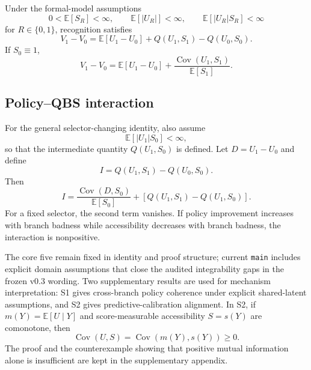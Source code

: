 Under the formal-model assumptions
\[
0<\mathbb E[S_R]<\infty,
\qquad
\mathbb E[|U_R|]<\infty,
\qquad
\mathbb E[|U_R|S_R]<\infty
\]
for $R\in\{0,1\}$, recognition satisfies
\[
V_1-V_0
=
\mathbb E[U_1-U_0]
+
Q(U_1,S_1)-Q(U_0,S_0).
\]
If $S_0\equiv1$,
\[
V_1-V_0
=
\mathbb E[U_1-U_0]
+
\frac{\operatorname{Cov}(U_1,S_1)}{\mathbb E[S_1]}.
\]

\subsection{Policy--QBS interaction}

For the general selector-changing identity, also assume
\[
\mathbb E[|U_1|S_0]<\infty,
\]
so that the intermediate quantity $Q(U_1,S_0)$ is defined. Let $D=U_1-U_0$ and define
\[
I=Q(U_1,S_1)-Q(U_0,S_0).
\]
Then
\[
I
=
\frac{\operatorname{Cov}(D,S_0)}{\mathbb E[S_0]}
+
\left[Q(U_1,S_1)-Q(U_1,S_0)\right].
\]
For a fixed selector, the second term vanishes. If policy improvement increases with branch badness while accessibility decreases with branch badness, the interaction is nonpositive.

The core five remain fixed in identity and proof structure; current \texttt{main} includes explicit domain assumptions that close the audited integrability gaps in the frozen v0.3 wording. Two supplementary results are used for mechanism interpretation: S1 gives cross-branch policy coherence under explicit shared-latent assumptions, and S2 gives predictive-calibration alignment. In S2, if $m(Y)=\mathbb E[U\mid Y]$ and score-measurable accessibility $S=s(Y)$ are comonotone, then
\[
\operatorname{Cov}(U,S)
=
\operatorname{Cov}(m(Y),s(Y))
\ge0.
\]
The proof and the counterexample showing that positive mutual information alone is insufficient are kept in the supplementary appendix.
